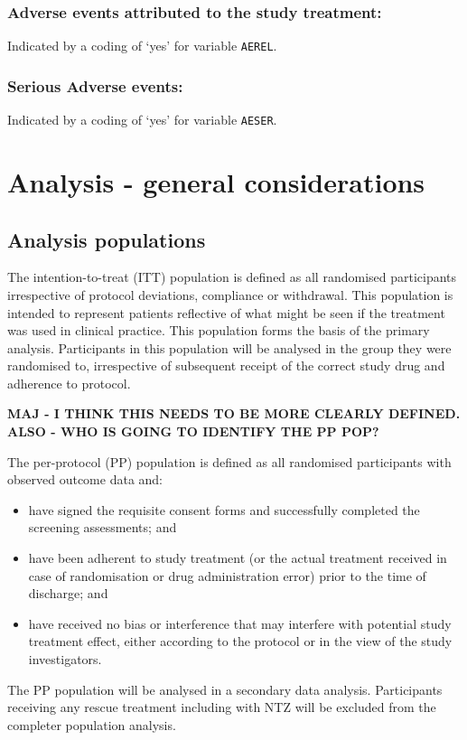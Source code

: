 \documentclass[a4paper]{article}
\begin{document}
\subsubsection{Adverse events attributed to the study treatment:}

Indicated by a coding of `yes' for variable \texttt{AEREL}. 

\subsubsection{Serious Adverse events:}

Indicated by a coding of `yes' for variable \texttt{AESER}.

\section{Analysis - general considerations}

\subsection{Analysis populations}

The intention-to-treat (ITT) population is defined as all randomised participants irrespective of protocol deviations, compliance or withdrawal.
This population is intended to represent patients reflective of what might be seen if the treatment was used in clinical practice.
This population forms the basis of the primary analysis.
Participants in this population will be analysed in the group they were randomised to, irrespective of subsequent receipt of the correct study drug and adherence to protocol.

\textbf{MAJ - I THINK THIS NEEDS TO BE MORE CLEARLY DEFINED. ALSO - WHO IS GOING TO IDENTIFY THE PP POP?}

The per-protocol (PP) population is defined as all randomised participants with observed outcome data and:
\begin{itemize}
    \item have signed the requisite consent forms and successfully completed the screening assessments; and
    \item have been adherent to study treatment (or the actual treatment received in case of randomisation or drug administration error) prior to the time of discharge; and
    \item have received no bias or interference that may interfere with potential study treatment effect, either according to the protocol or in the view of the study investigators.
\end{itemize}
The PP population will be analysed in a secondary data analysis.
Participants receiving any rescue treatment including with NTZ will be excluded from the completer population analysis.
\end{document}
